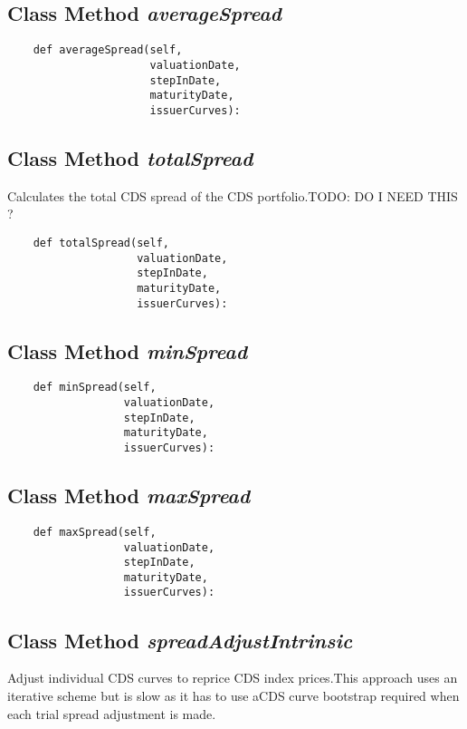 \documentclass[twoside,11pt]{book}
\begin{document}
\subsection{Class Method {\it averageSpread}}


\begin{lstlisting}
    def averageSpread(self,
                      valuationDate,
                      stepInDate,
                      maturityDate,
                      issuerCurves):
\end{lstlisting}

\subsection{Class Method {\it totalSpread}}
Calculates the total CDS spread of the CDS portfolio.TODO: DO I NEED THIS ? 

\begin{lstlisting}
    def totalSpread(self,
                    valuationDate,
                    stepInDate,
                    maturityDate,
                    issuerCurves):
\end{lstlisting}

\subsection{Class Method {\it minSpread}}


\begin{lstlisting}
    def minSpread(self,
                  valuationDate,
                  stepInDate,
                  maturityDate,
                  issuerCurves):
\end{lstlisting}

\subsection{Class Method {\it maxSpread}}


\begin{lstlisting}
    def maxSpread(self,
                  valuationDate,
                  stepInDate,
                  maturityDate,
                  issuerCurves):
\end{lstlisting}

\subsection{Class Method {\it spreadAdjustIntrinsic}}
Adjust individual CDS curves to reprice CDS index prices.This approach uses an iterative scheme but is slow as it has to use aCDS curve bootstrap required when each trial spread adjustment is made.
\end{document}
